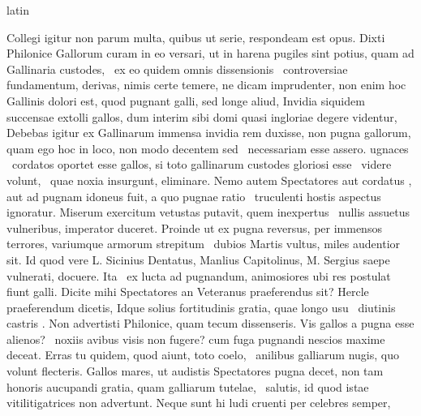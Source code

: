 \documentclass[12pt]{book}
\renewenvironment{latin}
    	{\begin{hyphenrules}{latin}}
    	{\end{hyphenrules}}
\begin{document}
\begin{pages}
\begin{latin}
\begin{Leftside}
                  Collegi igitur non parum multa, quibus ut serie, respondeam est opus. Dixti Philonice Gallorum curam  in eo versari, ut in harena pugiles sint potius, quam ad Gallinaria custodes,
                   \ampersand\ ex eo quidem omnis dissensionis  \ampersand\ controversiae fundamentum, derivas, nimis certe temere, ne dicam imprudenter, non enim hoc 
                  Gallinis dolori est, quod pugnant galli, sed longe aliud, Invidia siquidem succensae  extolli gallos, 
                  dum interim  sibi domi quasi ingloriae degere videntur, Debebas igitur ex Gallinarum immensa invidia rem duxisse, non pugna gallorum,
                  quam ego hoc in loco, non modo decentem sed  \ampersand\ necessariam esse assero.  ugnaces 
                   \ampersand\ cordatos oportet esse gallos, si toto gallinarum custodes gloriosi esse  \ampersand\ videre volunt,  \ampersand\ quae noxia insurgunt, eliminare. 
                  Nemo autem Spectatores aut cordatus , aut ad pugnam idoneus fuit, a quo pugnae ratio
                   \ampersand\ truculenti hostis aspectus ignoratur. Miserum exercitum vetustas putavit, quem inexpertus  \ampersand\ nullis assuetus vulneribus, imperator duceret.
                  Proinde ut ex pugna reversus, per immensos terrores, variumque armorum strepitum   \ampersand\ dubios Martis vultus, miles audentior sit. Id quod vere L. Sicinius Dentatus, Manlius Capitolinus, M. Sergius saepe vulnerati, docuere.
                  Ita  \ampersand\ ex lucta ad pugnandum, animosiores ubi res postulat fiunt galli. Dicite mihi Spectatores an  Veteranus praeferendus sit? 
                  Hercle praeferendum dicetis, Idque solius fortitudinis gratia, quae longo usu  \ampersand\ diutinis castris . 
                  Non advertisti Philonice, quam tecum dissenseris. Vis gallos a pugna esse alienos?  \ampersand\ noxiis avibus visis non fugere? cum fuga pugnandi nescios maxime deceat.
                  Erras tu quidem, quod aiunt, toto coelo,  \ampersand\ anilibus galliarum nugis, quo volunt flecteris. Gallos mares, ut audistis Spectatores pugna decet, non tam honoris aucupandi gratia,
                  quam galliarum tutelae,  \ampersand\ salutis, id quod istae vitilitigatrices non advertunt. Neque sunt hi  ludi cruenti per celebres semper,

\end{Leftside}
\end{latin}
\end{pages}
\end{document}
